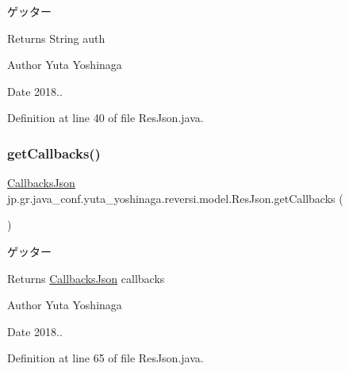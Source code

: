 ゲッター 

\begin{DoxyReturn}{Returns}
String auth 
\end{DoxyReturn}
\begin{DoxyAuthor}{Author}
Yuta Yoshinaga 
\end{DoxyAuthor}
\begin{DoxyDate}{Date}
2018.. 
\end{DoxyDate}


Definition at line 40 of file Res\+Json.\+java.

\mbox{\label{classjp_1_1gr_1_1java__conf_1_1yuta__yoshinaga_1_1reversi_1_1model_1_1_res_json_a1bd6cdcfb3ea59616409b5aae1d408e2}} 
\subsubsection{\texorpdfstring{get\+Callbacks()}{getCallbacks()}}
{\footnotesize\ttfamily \hyperlink{classjp_1_1gr_1_1java__conf_1_1yuta__yoshinaga_1_1reversi_1_1model_1_1_callbacks_json}{Callbacks\+Json} jp.\+gr.\+java\+\_\+conf.\+yuta\+\_\+yoshinaga.\+reversi.\+model.\+Res\+Json.\+get\+Callbacks (\begin{DoxyParamCaption}{ }\end{DoxyParamCaption})}



ゲッター 

\begin{DoxyReturn}{Returns}
\hyperlink{classjp_1_1gr_1_1java__conf_1_1yuta__yoshinaga_1_1reversi_1_1model_1_1_callbacks_json}{Callbacks\+Json} callbacks 
\end{DoxyReturn}
\begin{DoxyAuthor}{Author}
Yuta Yoshinaga 
\end{DoxyAuthor}
\begin{DoxyDate}{Date}
2018.. 
\end{DoxyDate}


Definition at line 65 of file Res\+Json.\+java.

